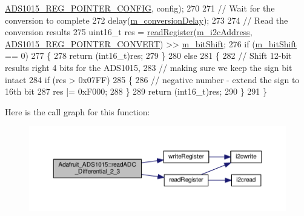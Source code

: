 \begin{DoxyCode}
      \hyperlink{_cool_adafruit___a_d_s1015_8h_ab9abb781632542a0e7d8b058292f26b1}{ADS1015\_REG\_POINTER\_CONFIG}, config);
270 
271   \textcolor{comment}{// Wait for the conversion to complete}
272   delay(\hyperlink{class_adafruit___a_d_s1015_aa3a29a64a6705fce1fee21d73c642a0e}{m\_conversionDelay});
273 
274   \textcolor{comment}{// Read the conversion results}
275   uint16\_t res = \hyperlink{_cool_adafruit___a_d_s1015_8cpp_a319539381b7551b2f83a92b0b596e97d}{readRegister}(\hyperlink{class_adafruit___a_d_s1015_a2186993621a7973256d47f086c74035d}{m\_i2cAddress}, 
      \hyperlink{_cool_adafruit___a_d_s1015_8h_a0f462c806b353bd682fa3c2d67e66622}{ADS1015\_REG\_POINTER\_CONVERT}) >> \hyperlink{class_adafruit___a_d_s1015_ab238ce17112a78db2be4ea14d57fb114}{m\_bitShift};
276   \textcolor{keywordflow}{if} (\hyperlink{class_adafruit___a_d_s1015_ab238ce17112a78db2be4ea14d57fb114}{m\_bitShift} == 0)
277   \{
278     \textcolor{keywordflow}{return} (int16\_t)res;
279   \}
280   \textcolor{keywordflow}{else}
281   \{
282     \textcolor{comment}{// Shift 12-bit results right 4 bits for the ADS1015,}
283     \textcolor{comment}{// making sure we keep the sign bit intact}
284     \textcolor{keywordflow}{if} (res > 0x07FF)
285     \{
286       \textcolor{comment}{// negative number - extend the sign to 16th bit}
287       res |= 0xF000;
288     \}
289     \textcolor{keywordflow}{return} (int16\_t)res;
290   \}
291 \}
\end{DoxyCode}
Here is the call graph for this function\+:\nopagebreak
\begin{figure}[H]
\begin{center}
\leavevmode
\includegraphics[width=350pt]{df/df6/class_adafruit___a_d_s1015_a38311881bcab46f7496c4bb6e4cad576_cgraph}
\end{center}
\end{figure}
\mbox{\label{class_adafruit___a_d_s1015_a40f38b9e1f3ec397c0670dd632510235}} 
